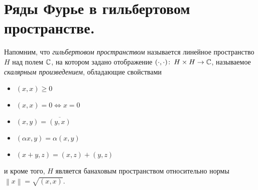 \documentclass[../complex-analysis.tex]{subfiles}
\begin{document}
 
\section{Ряды Фурье в гильбертовом пространстве.}

Напомним, что \textit{гильбертовом пространством} называется линейное пространство $ H $ над полем $ \mathbb{C} $, на котором задано отображение $ (\cdot,\cdot) \colon\, H \times H \to \mathbb{C} $, называемое \textit{скалярным произведением}, обладающие свойствами
\begin{itemize}
 \item $ (x,x) \geqslant 0 $
 \item $ (x,x) = 0 \iff x = 0 $
 \item $ (x,y) = \overline{(y,x)} $
 \item $ (\alpha x, y) = \alpha(x,y) $
 \item $ (x + y, z) = (x,z) + (y,z) $
\end{itemize} и кроме того, $ H $ является банаховым пространством относительно нормы $ \left\| x \right\|  = \sqrt{(x,x)}$.
\end{document}
